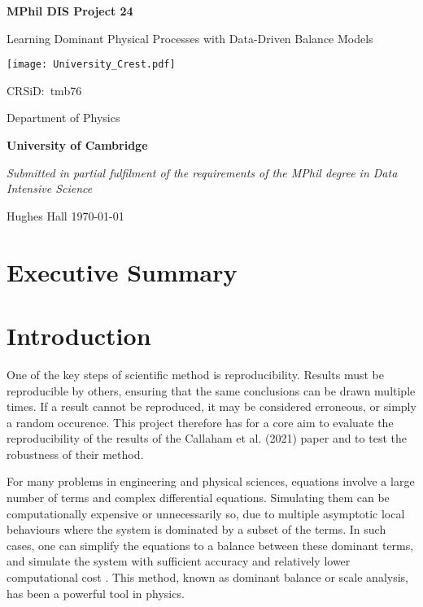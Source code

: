 \documentclass[12pt]{report} %
\begin{document}
\begin{titlepage}
  \centering
  {\LARGE\bfseries MPhil DIS Project 24\par}
  {\LARGE Learning Dominant Physical Processes with Data-Driven Balance Models\par}
  \vspace{1cm}
  {\texttt{[image: University\_Crest.pdf]}\par}
  {\Large CRSiD:\ tmb76\par}
  \vspace{1cm}
  {\Large Department of Physics\par}
  {\Large\bfseries University of Cambridge\par}
  \vfill
  {\itshape Submitted in partial fulfilment of the requirements of the MPhil degree in Data Intensive Science}
  \vfill
  {\large Hughes Hall  \hspace{6cm} \today\par}
\end{titlepage}

\tableofcontents

\chapter{Executive Summary}


\chapter{Introduction}


One of the key steps of scientific method is reproducibility. Results must be reproducible by others, ensuring that the same conclusions can be drawn multiple times. If a result cannot be reproduced, it may be considered erroneous, or simply a random occurence. This project therefore has for a core aim to evaluate the reproducibility of the results of the Callaham et al. (2021)\cite{callaham2021learning} paper and to test the robustness of their method.

\vspace{5mm}

For many problems in engineering and physical sciences, equations involve a large number of terms and complex differential equations. Simulating them can be computationally expensive or unnecessarily so, due to multiple asymptotic local behaviours where the system is dominated by a subset of the terms. In such cases, one can simplify the equations to a balance between these dominant terms, and simulate the system with sufficient accuracy and relatively lower computational cost \cite{charney1990scale}. This method, known as dominant balance or scale analysis, has been a powerful tool in physics.
\end{document}
